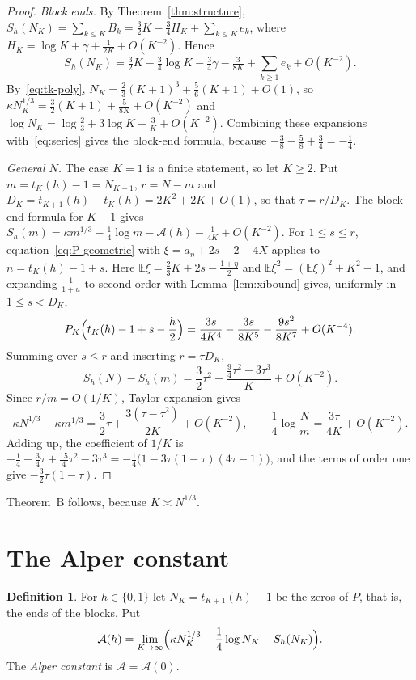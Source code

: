\documentclass[11pt]{article}
\theoremstyle{definition}
\newtheorem{definition}[theorem]{Definition}
\theoremstyle{remark}
\newcommand{\E}{\mathbb{E}}
\newcommand{\Alp}{\mathcal{A}}
\begin{document}
\begin{proof}
\emph{Block ends.} By Theorem~\ref{thm:structure},
$S_h(N_K)=\sum_{k\le K}B_k=\frac32K-\frac34H_K+\sum_{k\le K}e_k$, where
$H_K=\log K+\gamma+\frac1{2K}+O(K^{-2})$. Hence
\[
S_h(N_K)=\tfrac32K-\tfrac34\log K-\tfrac34\gamma-\tfrac3{8K}
+\textstyle\sum_{k\ge1}e_k+O(K^{-2}).
\]
By~\eqref{eq:tk-poly}, $N_K=\frac23(K+1)^3+\frac56(K+1)+O(1)$, so
$\kappa N_K^{1/3}=\frac32(K+1)+\frac5{8K}+O(K^{-2})$ and
$\log N_K=\log\frac23+3\log K+\frac3K+O(K^{-2})$. Combining these
expansions with~\eqref{eq:series} gives the block-end formula, because
$-\frac38-\frac58+\frac34=-\frac14$.

\emph{General $N$.} The case $K=1$ is a finite statement, so let
$K\ge2$. Put $m=t_K(h)-1=N_{K-1}$, $r=N-m$ and
$D_K=t_{K+1}(h)-t_K(h)=2K^2+2K+O(1)$, so that $\tau=r/D_K$. The block-end
formula for $K-1$ gives
$S_h(m)=\kappa m^{1/3}-\frac14\log m-\Alp(h)-\frac1{4K}+O(K^{-2})$. For
$1\le s\le r$, equation~\eqref{eq:P-geometric} with
$\xi=a_\eta+2s-2-4X$ applies to $n=t_K(h)-1+s$. Here
$\E\xi=\frac23K+2s-\frac{1+\eta}2$ and $\E\xi^2=(\E\xi)^2+K^2-1$, and
expanding $\frac1{1+u}$ to second order with Lemma~\ref{lem:xibound}
gives, uniformly in $1\le s<D_K$,
\[
P_K\Bigl(t_K(h)-1+s-\frac h2\Bigr)=\frac{3s}{4K^4}-\frac{3s}{8K^5}
-\frac{9s^2}{8K^7}+O(K^{-4}).
\]
Summing over $s\le r$ and inserting $r=\tau D_K$,
\[
S_h(N)-S_h(m)=\frac32\tau^2+\frac{\frac94\tau^2-3\tau^3}{K}+O(K^{-2}).
\]
Since $r/m=O(1/K)$, Taylor expansion gives
\[
\kappa N^{1/3}-\kappa m^{1/3}=\frac32\tau+\frac{3(\tau-\tau^2)}{2K}
+O(K^{-2}),\qquad
\frac14\log\frac Nm=\frac{3\tau}{4K}+O(K^{-2}).
\]
Adding up, the coefficient of $1/K$ is
$-\frac14-\frac34\tau+\frac{15}4\tau^2-3\tau^3
=-\frac14\bigl(1-3\tau(1-\tau)(4\tau-1)\bigr)$, and the terms of order
one give $-\frac32\tau(1-\tau)$.
\end{proof}

Theorem~B follows, because $K\asymp N^{1/3}$.

\section{The Alper constant}\label{sec:constant}

\begin{definition}\label{def:alper}
For $h\in\{0,1\}$ let $N_K=t_{K+1}(h)-1$ be the zeros of $P$, that is,
the ends of the blocks. Put
\[
\Alp(h)=\lim_{K\to\infty}\Bigl(\kappa N_K^{1/3}-\frac14\log N_K
-S_h(N_K)\Bigr).
\]
The \emph{Alper constant} is $\Alp=\Alp(0)$.
\end{definition}
\end{document}
